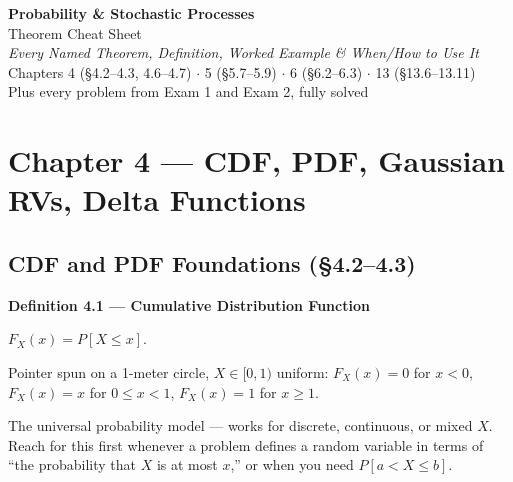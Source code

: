 \documentclass[10pt]{article}
\title{}
\date{}
\renewcommand{\P}[1]{P\left[#1\right]}
\newcommand{\cheatdef}[4]{%
  \par\vspace{6pt}\noindent{\color{defcol}\rule{\linewidth}{1pt}}\par\vspace{2pt}
  \noindent\textbf{\color{defcol}#1}\par\smallskip\noindent
  #2\par\smallskip
  \noindent{\small\color{excol}\textbf{Example:}} \small #3\par\smallskip
  \noindent{\small\color{notecol}\textbf{Use it when / how:}} \small #4\par
}
\begin{document}
\thispagestyle{empty}
\begin{center}
{\Huge\bfseries Probability \& Stochastic Processes}\\[8pt]
{\LARGE Theorem Cheat Sheet}\\[4pt]
{\large\itshape Every Named Theorem, Definition, Worked Example \& When/How to Use It}\\[18pt]
{\normalsize Chapters 4 (\S4.2--4.3, 4.6--4.7) $\cdot$ 5 (\S5.7--5.9) $\cdot$ 6 (\S6.2--6.3) $\cdot$ 13 (\S13.6--13.11)}\\[4pt]
{\normalsize Plus every problem from Exam 1 and Exam 2, fully solved}
\end{center}

\vspace{10pt}
\noindent{}

\vspace{6pt}
\tableofcontents

\clearpage
\section{Chapter 4 --- CDF, PDF, Gaussian RVs, Delta Functions}

\subsection{CDF and PDF Foundations (\S4.2--4.3)}

\cheatdef{Definition 4.1 --- Cumulative Distribution Function}{
$F_X(x) = \P{X\le x}$.
}{
Pointer spun on a 1-meter circle, $X\in[0,1)$ uniform: $F_X(x)=0$ for $x<0$, $F_X(x)=x$ for
$0\le x<1$, $F_X(x)=1$ for $x\ge1$.
}{
The universal probability model --- works for discrete, continuous, or mixed $X$. Reach for
this first whenever a problem defines a random variable in terms of ``the probability that
$X$ is at most $x$,'' or when you need $\P{a<X\le b}$.
}
\end{document}

